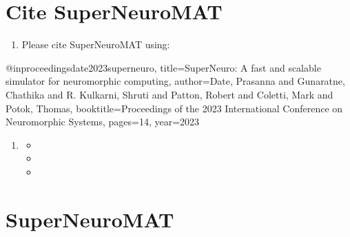 \documentclass[letterpaper,10pt,english]{sphinxmanual}
\begin{document}
\chapter{Cite SuperNeuroMAT}
\label{\detokenize{index:cite-superneuromat}}\begin{enumerate}
%
\item {} 
\sphinxAtStartPar
Please cite SuperNeuroMAT using:

\end{enumerate}

\begin{sphinxVerbatim}[commandchars=\\\{\}]
@inproceedings\PYGZob{}date2023superneuro,
  title=\PYGZob{}SuperNeuro: A fast and scalable simulator for neuromorphic computing\PYGZcb{},
  author=\PYGZob{}Date, Prasanna and Gunaratne, Chathika and R. Kulkarni, Shruti and Patton, Robert and Coletti, Mark and Potok, Thomas\PYGZcb{},
  booktitle=\PYGZob{}Proceedings of the 2023 International Conference on Neuromorphic Systems\PYGZcb{},
  pages=\PYGZob{}1\PYGZhy{}\PYGZhy{}4\PYGZcb{},
  year=\PYGZob{}2023\PYGZcb{}
\PYGZcb{}
\end{sphinxVerbatim}
\begin{enumerate}
%
\item {} \begin{description}
\begin{itemize}
\item {} 
\sphinxAtStartPar
{}

\item {} 
\sphinxAtStartPar
{}

\item {} 
\sphinxAtStartPar
{}

\end{itemize}

\end{description}

\end{enumerate}


\chapter{SuperNeuroMAT}
\label{\detokenize{index:module-superneuromat}}\label{\detokenize{index:superneuromat}}
\end{document}
